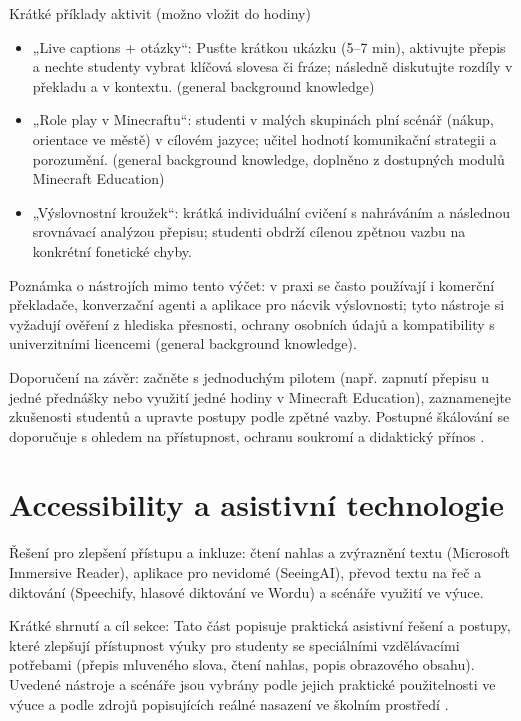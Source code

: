 \documentclass{report}%
\begin{document}
Krátké příklady aktivit (možno vložit do hodiny)
\begin{itemize}
  \item „Live captions + otázky“: Pusťte krátkou ukázku (5–7 min), aktivujte přepis a nechte studenty vybrat klíčová slovesa či fráze; následně diskutujte rozdíly v překladu a v kontextu. (general background knowledge)
  \item „Role play v Minecraftu“: studenti v malých skupinách plní scénář (nákup, orientace ve městě) v cílovém jazyce; učitel hodnotí komunikační strategii a porozumění. (general background knowledge, doplněno z dostupných modulů Minecraft Education) \cite{kb_ai_101_tipu_pdf_04e4a115_page_15_2}
  \item „Výslovnostní kroužek“: krátká individuální cvičení s nahráváním a následnou srovnávací analýzou přepisu; studenti obdrží cílenou zpětnou vazbu na konkrétní fonetické chyby.
\end{itemize}

Poznámka o nástrojích mimo tento výčet: v praxi se často používají i komerční překladače, konverzační agenti a aplikace pro nácvik výslovnosti; tyto nástroje si vyžadují ověření z hlediska přesnosti, ochrany osobních údajů a kompatibility s univerzitními licencemi (general background knowledge).

Doporučení na závěr: začněte s jednoduchým pilotem (např. zapnutí přepisu u jedné přednášky nebo využití jedné hodiny v Minecraft Education), zaznamenejte zkušenosti studentů a upravte postupy podle zpětné vazby. Postupné škálování se doporučuje s ohledem na přístupnost, ochranu soukromí a didaktický přínos \cite{kb_ai_101_tipu_pdf_04e4a115_page_15_2}.%

%
\section{Accessibility a asistivní technologie}%
Řešení pro zlepšení přístupu a inkluze: čtení nahlas a zvýraznění textu (Microsoft Immersive Reader), aplikace pro nevidomé (SeeingAI), převod textu na řeč a diktování (Speechify, hlasové diktování ve Wordu) a scénáře využití ve výuce.%


%
\begin{flushleft}
Krátké shrnutí a cíl sekce: Tato část popisuje praktická asistivní řešení a postupy, které zlepšují přístupnost výuky pro studenty se speciálními vzdělávacími potřebami (přepis mluveného slova, čtení nahlas, popis obrazového obsahu). Uvedené nástroje a scénáře jsou vybrány podle jejich praktické použitelnosti ve výuce a podle zdrojů popisujících reálné nasazení ve školním prostředí \cite{kb_ai_101_tipu_pdf_04e4a115_page_11_1, kb_ai_101_tipu_pdf_04e4a115_page_7_1}.
\end{flushleft}
\end{document}
